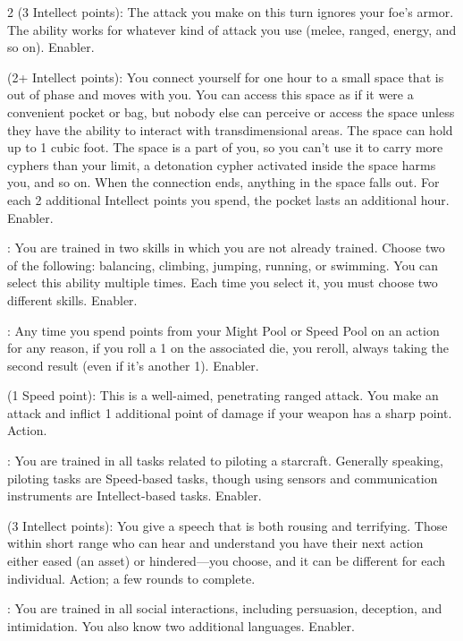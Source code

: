 \begin{multicols}{2}
 (3 Intellect points): The attack you make on this turn ignores your foe’s armor. The ability works for whatever kind of attack you use (melee, ranged, energy, and so on). Enabler. 
 
 (2+ Intellect points): You connect yourself for one hour to a small space that is out of phase and moves with you. You can access this space as if it were a convenient pocket or bag, but nobody else can perceive or access the space unless they have the ability to interact with transdimensional areas. The space can hold up to 1 cubic foot. The space is a part of you, so you can’t use it to carry more cyphers than your limit, a detonation cypher activated inside the space harms you, and so on. When the connection ends, anything in the space falls out. For each 2 additional Intellect points you spend, the pocket lasts an additional hour. Enabler.
 
: You are trained in two skills in which you are not already trained. Choose two of the following: balancing, climbing, jumping, running, or swimming. You can select this ability multiple times. Each time you select it, you must choose two different skills. Enabler. 
 
: Any time you spend points from your Might Pool or Speed Pool on an action for any reason, if you roll a 1 on the associated die, you reroll, always taking the second result (even if it’s another 1). Enabler. 
 
 (1 Speed point): This is a well-aimed, penetrating ranged attack. You make an attack and inflict 1 additional point of damage if your weapon has a sharp point. Action. 
 
: You are trained in all tasks related to piloting a starcraft. Generally speaking, piloting tasks are Speed-based tasks, though using sensors and communication instruments are Intellect-based tasks. Enabler. 
 
 (3 Intellect points): You give a speech that is both rousing and terrifying. Those within short range who can hear and understand you have their next action either eased (an asset) or hindered—you choose, and it can be different for each individual. Action; a few rounds to complete.
 
: You are trained in all social interactions, including persuasion, deception, and intimidation. You also know two additional languages. Enabler. 
 

\end{multicols}
